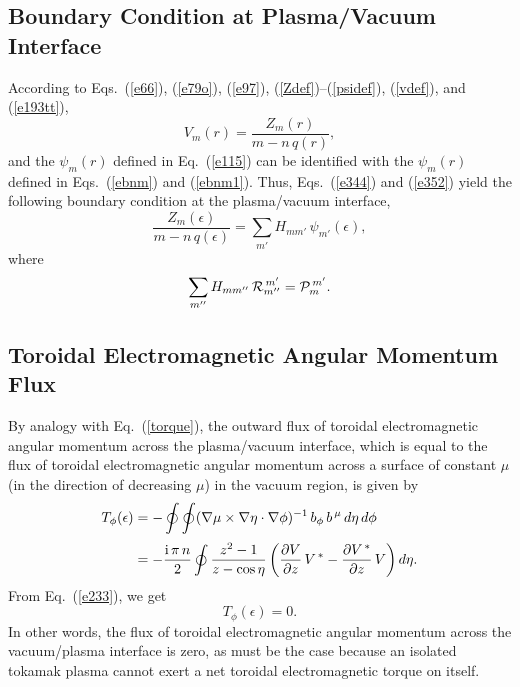 \documentclass[12pt,prb,aps]{revtex4-1}
\begin{document}
\subsection{Boundary Condition at Plasma/Vacuum Interface}
According to Eqs.~(\ref{e66}), (\ref{e79o}), (\ref{e97}), (\ref{Zdef})--(\ref{psidef}),  (\ref{vdef}), and (\ref{e193tt}), 
\begin{equation}\label{evdef}
V_m(r)= \frac{Z_m(r)}{m-n\,q(r)},
\end{equation}
and the $\psi_m(r)$ defined in Eq.~(\ref{e115}) can be identified with the $\psi_m(r)$ defined in Eqs.~(\ref{ebnm}) and (\ref{ebnm1}). 
Thus, Eqs.~(\ref{e344}) and (\ref{e352}) yield the following boundary condition at the plasma/vacuum interface,
\begin{equation}\label{bc}
\frac{Z_m(\epsilon)}{m-n\,q(\epsilon)} = \sum_{m'} H_{mm'}\,\psi_{m'}(\epsilon),
\end{equation}
where
\begin{equation}\label{ehdef}
\sum_{m''}H_{mm''}\,{\cal R}_{m''}^{\,m'} = {\cal P}_m^{\,m'}.
\end{equation}

\subsection{Toroidal Electromagnetic Angular Momentum Flux}
By analogy with Eq.~(\ref{torque}), the outward flux of toroidal electromagnetic angular momentum across the plasma/vacuum interface,
which is equal to the flux of  toroidal electromagnetic angular momentum across a surface of constant $\mu$ (in the direction of
decreasing $\mu$) in the vacuum region, is given by 
\begin{align}
T_\phi(\epsilon) &= -\oint\oint (\nabla\mu\times \nabla\eta\cdot\nabla\phi)^{-1}\,b_\phi\,b^{\,\mu}\,d\eta\,d\phi\nonumber\\[0.5ex]
&= -\frac{{\rm i}\,\pi\,n}{2}\oint \frac{z^2-1}{z-\cos\eta}\left(\frac{\partial V}{\partial z}\,V^{\,\ast}-\frac{\partial V^{\,\ast}}{\partial z}\,V\right)d\eta.
\end{align}
From Eq.~(\ref{e233}), we get
\begin{equation}\label{e300}
T_\phi(\epsilon)=0.
\end{equation}
In other words, the flux of toroidal  electromagnetic angular momentum across the vacuum/plasma interface is zero, as must be the
case because an isolated tokamak plasma cannot exert a net toroidal electromagnetic torque on itself.\cite{am1}
\end{document}

